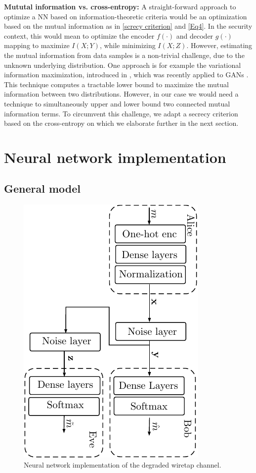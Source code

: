 \documentclass[conference]{IEEEtran}
\begin{document}
{\bf Mututal information vs. cross-entropy:}
A straight-forward approach to optimize a NN based on information-theoretic criteria would be an optimization based on the mutual information as in \eqref{screcy criterion} and \eqref{Eq4}. In the security context, this would mean to optimize the encoder $f(\cdot)$ and decoder $g(\cdot)$ mapping to maximize $I(X;Y)$, while minimizing $I(X;Z)$. However, estimating the mutual information from data samples is a non-trivial challenge, due to the unknown underlying distribution. One approach is for example the variational information maximization, introduced in \cite{barber2003algorithm}, which was recently applied to GANs \cite{chen2016infogan}. This technique computes a tractable lower bound to maximize the mutual information between two distributions. However, in our case we would need a technique to simultaneously upper and lower bound two connected mutual information terms. To circumvent this challenge, we adapt a secrecy criterion based on the cross-entropy on which we elaborate further in the next section.

\section{Neural network implementation}
\subsection{General model}

\begin{figure}
\centering
\includegraphics[scale=0.8,angle=90]{DegradedWiretapNN3.pdf}
\caption{Neural network implementation of the degraded wiretap channel.}
\label{WiretapNN}
\end{figure}
\end{document}
